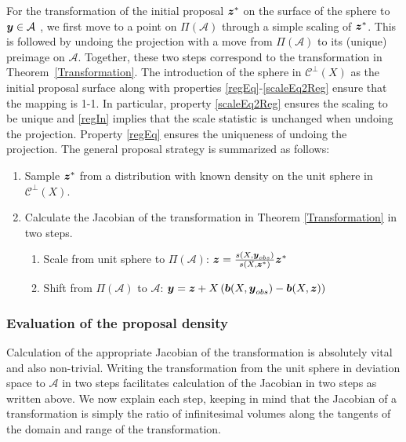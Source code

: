 \documentclass[12pt]{article}
\newcommand{\by}{\mbox{\boldmath $y$}}
\newcommand{\bz}{\mbox{\boldmath $z$}}
\newcommand{\bb}{\mbox{\boldmath $b$}}
\newcommand{\mc}{\mathcal}
\newcommand{\green}[1]{{\color{green}#1}}
\begin{document}
For the transformation of the initial proposal $\bz^*$ on the surface of the sphere to $\by\in \mc A$ , we first move to a point on $\Pi(\mathcal{A})$ through a 
simple scaling of $\bz^*$.  This is followed by undoing the projection with a move from 
$\Pi(\mathcal{A})$ to its (unique) preimage on $\mathcal{A}$. Together, these two steps correspond to the
transformation in Theorem~\ref{Transformation}.  The introduction of
the sphere in $\mc {C}^\perp (X)$ as the initial proposal surface
along with properties \ref{regEq}-\ref{scaleEq2Reg} ensure that the mapping is
1-1. In particular, property
\ref{scaleEq2Reg} ensures the scaling to be unique and \ref{regIn}
implies that the scale statistic is unchanged when undoing the
projection. Property \ref{regEq} ensures the uniqueness of undoing the
projection.  The general proposal strategy is summarized as follows:
\begin{enumerate}
\item Sample $\bz^*$ from a distribution with known density on the unit sphere in $\mc{C}^\perp(X)$.
\item Calculate the Jacobian of \green{the} transformation in Theorem \ref{Transformation} in two steps.
\begin{enumerate}
\item Scale from unit sphere to $\Pi(\mathcal{A})$: $\bz=\frac{s(X,\boldsymbol{y}_{obs})}{s(X, \boldsymbol{z}^{*})}\bz^{*}$
\item Shift  from $\Pi(\mathcal{A})$ to $\mathcal{A}$: $\by=\bz+X\left(\bb(X, \by_{obs})-\bb(X, \bz)\right)$
\end{enumerate}
\end{enumerate}

\subsubsection{Evaluation of the proposal density} 
Calculation of the appropriate Jacobian of the transformation is absolutely vital and also non-trivial. Writing the transformation from the unit sphere in deviation space to $\mathcal{A}$ in 
two steps facilitates calculation of the Jacobian in two steps as written above. %
We now explain each step, keeping in mind that the Jacobian of a transformation is simply the ratio of infinitesimal volumes along the tangents of the domain and range of the transformation. 
\end{document}
